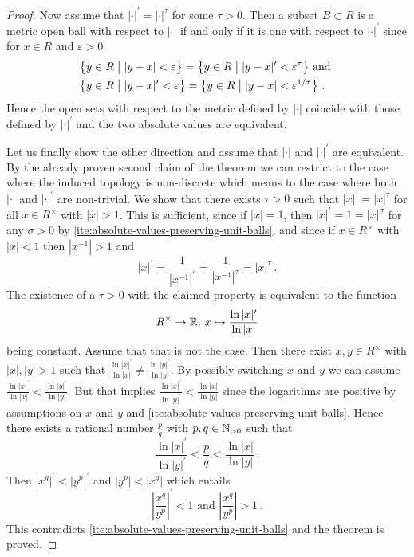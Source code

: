 \begin{proof}
  Now assume that $|\cdot|^\prime =|\cdot|^\tau$ for some $\tau>0$. Then a subset $B \subset R$ is a metric
  open ball with respect to $|\cdot|$ if and only if it is one with respect to $|\cdot|^\prime$
  since for $x \in R$ and $\varepsilon >0$
  \begin{equation*}
  \begin{split}
    &\big\{ y \in R \bigm\vert |y -x| < \varepsilon \big\}  = \big\{ y \in R \bigm\vert |y-x|^\prime < \varepsilon^\tau \big\}
    \text{ and } \\
    &\big\{ y \in R \bigm\vert |y- x|^\prime < \varepsilon \big\}  = \big\{ y \in R \bigm\vert |y-x| < \varepsilon^{1/\tau} \big\} \ .
  \end{split}
  \end{equation*}
  Hence the open sets with respect to the metric defined by $|\cdot|$ coincide with those defined by $|\cdot|^\prime$ and
  the two absolute values  are equivalent.

  Let us finally show the other direction and assume that $|\cdot|$ and $|\cdot|^\prime$ are equivalent.
  By the already proven second claim of the theorem we can restrict to the case where the induced topology is non-discrete
  which means to the case where both  $|\cdot|$ and $|\cdot|^\prime$ are non-trivial.
  We show that there exists $\tau >0$ such that $|x|^\prime =  |x|^\tau $ for all $x\in R^\times$ with $ |x|> 1$.
  This is sufficient, since if $ |x|= 1$, then $|x|^\prime =  1 = |x|^\sigma $ for any $\sigma >0$ 
  by \ref{ite:absolute-values-preserving-unit-balls}, and since if $x\in R^\times$ with $ |x|< 1$ then
  $ |x^{-1}| > 1$ and
  \[
     |x|^\prime = \frac{1}{\left|x^{-1}\right|^\prime} = \frac{1}{\left|x^{-1}\right|^\tau} = |x|^\tau \ .
  \]
  The existence of a $\tau >0$ with the claimed property is equivalent to the function
  \[
       R^\times \to \mathbb{R},\: x \mapsto \frac{\ln |x|^\prime}{\ln |x|}
  \]
  being constant. Assume that that is not the case. Then there exist $x,y \in R^\times$
  with $|x|,|y|>1$ such that
  $\frac{\ln |x|^\prime}{\ln |x|} \neq \frac{\ln |y|^\prime}{\ln |y|}$. By possibly switching $x$ and $y$ we
  can assume  $\frac{\ln |x|^\prime}{\ln |x|} < \frac{\ln |y|^\prime}{\ln |y|}$.
  But that implies $\frac{\ln |x|^\prime}{\ln |y|^\prime} < \frac{\ln |x|}{\ln |y|}$ since the logarithms are positive
  by assumptions on $x$ and $y$ and \ref{ite:absolute-values-preserving-unit-balls}. Hence there exists a
  rational number $\frac pq$ with $p,q \in \mathbb{N}_{> 0}$ such that
  \[
   \frac{\ln |x|^\prime}{\ln |y|^\prime} < \frac pq < \frac{\ln |x|}{\ln |y|} \ . 
  \]
  Then $|x^q|^\prime <  |y^p|^\prime$ and $|y^p| <  |x^q|$ which entails
  \[
    \left| \frac{x^q}{y^p} \right|^\prime < 1 \text{ and }
    \left| \frac{x^q}{y^p} \right| > 1 \ .
  \] 
  This contradicts \ref{ite:absolute-values-preserving-unit-balls} and the theorem is proved.
\end{proof}

